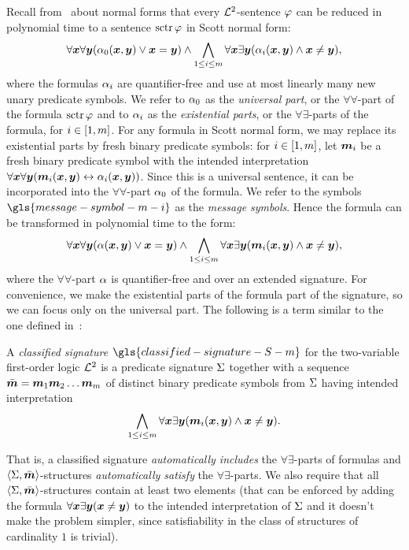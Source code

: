 Recall from~ about normal forms that every $\mathcal{L}^{2}$-sentence
$\varphi$ can be reduced in polynomial time to a sentence $\operatorname{sctr}\varphi$ in Scott
normal form:
\[
  \forall\bm{x}\forall\bm{y} (\alpha_{0}(\bm{x},\bm{y}) \lor \bm{x} = \bm{y}) \land
  \bigwedge_{1 \leq i \leq m} \forall\bm{x}\exists\bm{y}(
  \alpha_{i}(\bm{x},\bm{y}) \land \bm{x} \neq \bm{y}),
\]
where the formulas $\alpha_{i}$ are quantifier-free and use at most linearly many
new unary predicate symbols. We refer to $\alpha_{0}$ as the \emph{universal part},
or the $\forall\forall$-part of the formula $\operatorname{sctr}\varphi$ and to $\alpha_{i}$ as
the \emph{existential parts}, or the $\forall\exists$-parts of the formula,
for $i \in [1,m]$.
For any formula in Scott normal form, we may replace its existential parts
by fresh binary predicate symbols: for $i \in [1,m]$, let $\bm{m}_{i}$ be a
fresh binary predicate symbol with the intended interpretation
$\forall\bm{x}\forall\bm{y} (\bm{m}_{i}(\bm{x},\bm{y}) \leftrightarrow \alpha_{i}(\bm{x},\bm{y}))$.
Since this is a universal sentence, it can be incorporated into the
$\forall\forall$-part $\alpha_{0}$ of the formula.
We refer to the symbols $\gls{message-symbol-m-i}$ as the \emph{message
symbols}.
Hence the formula can be transformed in polynomial time to the form:
\begin{equation}\label{eq:twovar-msg-nf}
  \forall\xx\forall\yy (\falp(\xx,\yy) \lor \xx = \yy) \land
  \bigwedge_{1 \leq \ii \leq \nm} \forall\xx\exists\yy
  (\smm\ii(\xx,\yy) \land \xx \neq \yy),
\end{equation}
where the $\forall\forall$-part $\alpha$ is quantifier-free and over an extended
signature. For convenience, we make the existential parts of the formula part of
the signature, so we can focus only on the universal part. The following is a
term similar to the one defined in~\cite{MALQ:MALQ201400102}:
\begin{definition}
A \emph{classified signature} $\gls{classified-signature-S-m}$ for the
two-variable first-order logic $\mathcal{L}^{2}$ is a predicate signature $\mathrm{\Sigma}$ together
with a sequence $\sms = \smm1\smm2\dots\smm\nm$ of distinct binary predicate
symbols from $\mathrm{\Sigma}$ having intended interpretation
\begin{equation}\label{eq:twovar-ms-iinter}
  \bigwedge_{1 \leq \ii \leq \nm} \forall\xx\exists\yy 
  (\smm\ii(\xx,\yy) \land \xx \neq \yy).
\end{equation}
\end{definition}
That is, a classified signature \emph{automatically includes} the
$\forall\exists$-parts of formulas and $\left\langle \mathrm{\Sigma},\bar{\bm{m}} \right\rangle$-structures
\emph{automatically satisfy} the $\forall\exists$-parts. We also require that
all $\left\langle \mathrm{\Sigma},\bar{\bm{m}} \right\rangle$-structures contain at least two elements (that can be
enforced by adding the formula $\forall\bm{x}\exists\bm{y}(\bm{x}\neq\bm{y})$ to the
intended interpretation of $\mathrm{\Sigma}$ and it doesn't make the problem simpler,
since satisfiability in the class of structures of cardinality $1$ is trivial).

